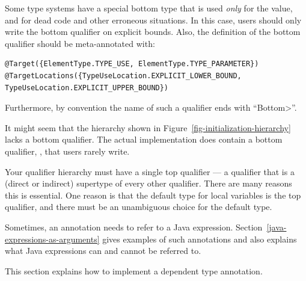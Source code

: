
Some type systems have a special bottom type that is used \emph{only} for
the  value, and for dead code and other erroneous situations.
In this case, users should only write the bottom qualifier on explicit
bounds.  Also, the definition of the bottom qualifier should be
meta-annotated with:

%
\begin{Verbatim}
@Target({ElementType.TYPE_USE, ElementType.TYPE_PARAMETER})
@TargetLocations({TypeUseLocation.EXPLICIT_LOWER_BOUND, TypeUseLocation.EXPLICIT_UPPER_BOUND})
\end{Verbatim}

Furthermore, by convention the name of such a qualifier ends with ``\<Bottom>''.

It might seem that the hierarchy shown in Figure~\ref{fig-initialization-hierarchy} lacks
a bottom qualifier.  The actual implementation does contain a bottom
qualifier, , that
users rarely write.


Your qualifier hierarchy must have a single top qualifier
--- a qualifier that is a (direct or indirect) supertype of every other
qualifier.
There are many reasons this is essential.
One reason is that the default type for local variables is the top
qualifier, and there must be an unambiguous choice for the default type.


\label{expression-annotations}

Sometimes, an annotation needs to refer to a Java expression.
Section~\ref{java-expressions-as-arguments} gives examples of such
annotations and also explains what Java expressions can and cannot be
referred to.

This section explains how to implement a dependent type annotation.

